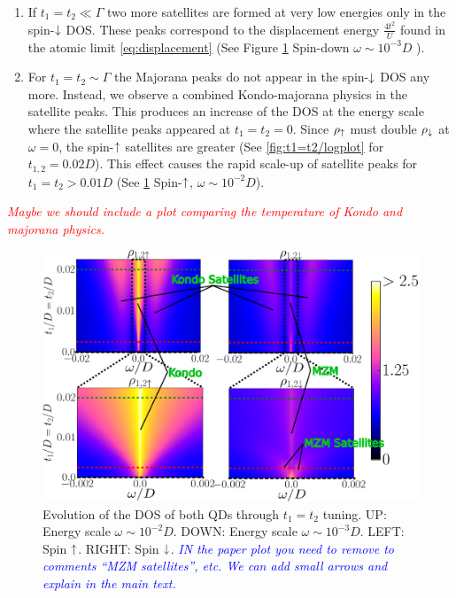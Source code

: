 \documentclass[showpacs,aps,prb,reprint,superscriptaddress]{revtex4-1}
\newcommand{\LUIS}[1]{\textcolor{blue}{\fbox{Luis} {\sl#1}}}
\newcommand{\Jesus}[1]{\textcolor{red}{\fbox{Jesus} {\sl#1}}}
\begin{document}
\begin{enumerate}
    \item If $t_1=t_2 \ll \Gamma $ two more satellites are formed at very low energies only in the spin-$\downarrow$ DOS. These peaks correspond to the displacement energy $\frac{4t^2}{U}$ found in the atomic limit \eqref{eq:displacement}  (See Figure \ref{fig:t1=t2-2D} Spin-down $\omega \sim 10^{-3}D$ ). 
    \item For $t_1=t_2 \sim \Gamma$ the Majorana peaks do not appear in the spin-$\downarrow$ DOS any more. Instead, we observe a combined Kondo-majorana physics in the satellite peaks. This produces an increase of the DOS at the energy scale where the satellite peaks appeared at $t_1=t_2=0$. Since $\rho_\uparrow$ must double $\rho_\downarrow$ at $\omega=0$, the spin-$\uparrow$ satellites are greater (See  \ref{fig:t1=t2/logplot} for $t_{1,2}=0.02D$). This effect causes the rapid scale-up of satellite peaks for $t_1=t_2>0.01D$  (See \ref{fig:t1=t2-2D} Spin-$\uparrow$, $\omega \sim 10^{-2}D$).
    
\end{enumerate}
    
    \Jesus{Maybe we should include a plot comparing the temperature of Kondo and majorana physics.}

    \begin{figure}[bt]
        \begin{center}
            \includegraphics[scale=0.26]{Graficos/t1=t2-2D.png}
            \caption{\label{fig:t1=t2-2D}Evolution of the DOS of both QDs through $t_1 = t_2$ tuning. UP: Energy scale $\omega \sim 10^{-2}D$. DOWN: Energy scale $\omega \sim 10^{-3}D$. LEFT: Spin $\uparrow$. RIGHT: Spin $\downarrow$. \LUIS{IN the paper plot you need to remove to comments ``MZM satellites'', etc. We can add small arrows and explain in the main text.}}
            \end{center}
    \end{figure}
    
\end{document}
